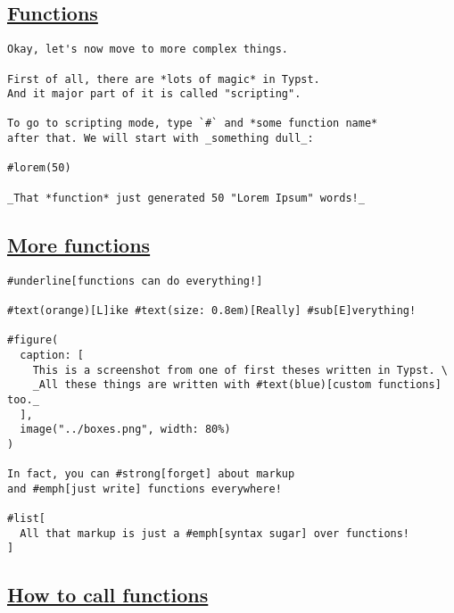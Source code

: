 \subsection{\texorpdfstring{\hyperref[functions-1]{Functions}}{Functions}}\label{functions-1}

\begin{verbatim}
Okay, let's now move to more complex things.

First of all, there are *lots of magic* in Typst.
And it major part of it is called "scripting".

To go to scripting mode, type `#` and *some function name*
after that. We will start with _something dull_:

#lorem(50)

_That *function* just generated 50 "Lorem Ipsum" words!_
\end{verbatim}

\pandocbounded{}

\subsection{\texorpdfstring{\hyperref[more-functions]{More
functions}}{More functions}}\label{more-functions}

\begin{verbatim}
#underline[functions can do everything!]

#text(orange)[L]ike #text(size: 0.8em)[Really] #sub[E]verything!

#figure(
  caption: [
    This is a screenshot from one of first theses written in Typst. \
    _All these things are written with #text(blue)[custom functions] too._
  ],
  image("../boxes.png", width: 80%)
)

In fact, you can #strong[forget] about markup
and #emph[just write] functions everywhere!

#list[
  All that markup is just a #emph[syntax sugar] over functions!
]
\end{verbatim}

\pandocbounded{}

\subsection{\texorpdfstring{\hyperref[how-to-call-functions]{How to call
functions}}{How to call functions}}\label{how-to-call-functions}

